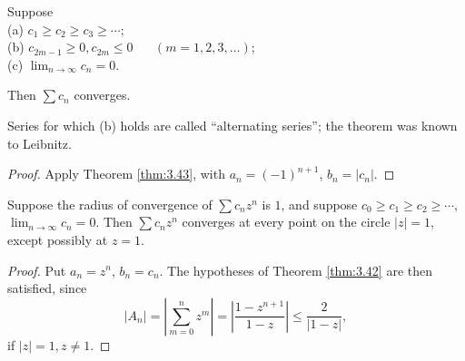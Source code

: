 \begin{thm}
    \label{thm:3.43}
    Suppose\\
    (a) $c_1 \geq c_2 \geq c_3 \geq \cdots$;\\
    (b) $c_{2m-1} \geq 0, c_{2m} \leq 0$ $\quad$ $(m = 1,2,3,\dots);$\\
    (c) $\lim_{n \to \infty} c_n = 0$.

Then $\sum c_n$ converges.
\end{thm}

Series for which (b) holds are called ``alternating series'';
the theorem was known to Leibnitz.

\begin{proof}
    Apply Theorem \ref{thm:3.43},
    with $a_n = (-1)^{n+1}$, $b_n = |c_n|$.  
\end{proof}

\begin{thm}
    \label{thm:3.44}
    Suppose the radius of convergence of $\sum c_n z^n$ is $1$,
    and suppose $c_0 \geq c_1 \geq c_2 \geq \cdots$, $\lim_{n \to \infty} c_n = 0$.
    Then $\sum c_n z^n$ converges at every point on the circle $|z| = 1$, except possibly at $z = 1$. 
\end{thm}

\begin{proof}
    Put $a_n = z^n$, $b_n = c_n$.
    The hypotheses of Theorem \ref{thm:3.42} are then satisfied, since
    \begin{equation*}
        |A_n| 
        = \left| \sum_{m=0}^{n} z^m \right|
        = \left| \frac{1 - z^{n+1}}{1 - z} \right|
        \leq \frac{2}{|1 - z|},
    \end{equation*}  
    if $|z|=1, z \neq 1$.
\end{proof}